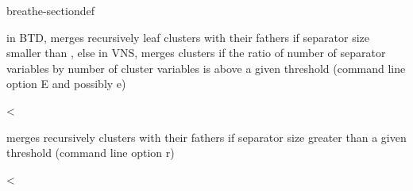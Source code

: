 \documentclass[letterpaper,10pt,openany,oneside,english]{sphinxmanual}
\begin{document}
\begin{fulllineitems}
\begin{sphinxuseclass}{breathe-sectiondef}
\begin{fulllineitems}
\sphinxAtStartPar
in BTD, merges recursively leaf clusters with their fathers if separator size smaller than {\hyperref[\detokenize{ref/ref_cpp:classToulBar2_1ab55513fadc69465246279c08ae56a238}]{}}, else in VNS, merges clusters if the ratio of number of separator variables by number of cluster variables is above a given threshold (command line option \sphinxhyphen{}E and possibly \sphinxhyphen{}e) 

\end{fulllineitems}


\begin{fulllineitems}
\label{\detokenize{ref/ref_cpp:_CPPv4N8ToulBar216minProperVarSizeE}}\label{\detokenize{ref/ref_cpp:_CPPv3N8ToulBar216minProperVarSizeE}}\label{\detokenize{ref/ref_cpp:_CPPv2N8ToulBar216minProperVarSizeE}}\label{\detokenize{ref/ref_cpp:ToulBar2::minProperVarSize__i}}
\pysigstartsignatures
\pysigstartmultiline
{}
\pysigstopmultiline
\pysigstopsignatures
\sphinxAtStartPar
\textless{} 

\sphinxAtStartPar
merges recursively clusters with their fathers if separator size greater than a given threshold (command line option \sphinxhyphen{}r) 

\end{fulllineitems}


\begin{fulllineitems}
\label{\detokenize{ref/ref_cpp:_CPPv4N8ToulBar216heuristicFreedomE}}\label{\detokenize{ref/ref_cpp:_CPPv3N8ToulBar216heuristicFreedomE}}\label{\detokenize{ref/ref_cpp:_CPPv2N8ToulBar216heuristicFreedomE}}\label{\detokenize{ref/ref_cpp:ToulBar2::heuristicFreedom__b}}
\pysigstartsignatures
\pysigstartmultiline
{}
\pysigstopmultiline
\pysigstopsignatures
\sphinxAtStartPar
\textless{} 


\end{fulllineitems}
\end{sphinxuseclass}
\end{fulllineitems}
\end{document}
